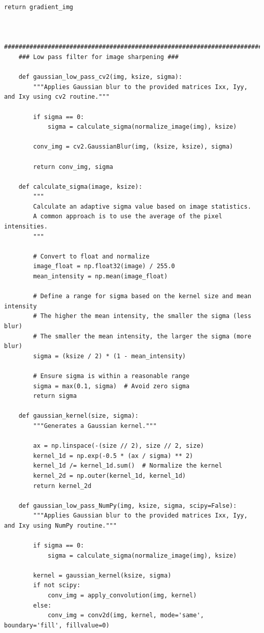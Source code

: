 \documentclass[11pt, conference, letterpaper]{IEEEtran}
\begin{document}
\begin{lstlisting}[style=python, caption={\texttt{image\_utils.py}}, label={lst:iutils}]
        return gradient_img
    
    
    ##########################################################################################
    ### Low pass filter for image sharpening ###
    
    def gaussian_low_pass_cv2(img, ksize, sigma):
        """Applies Gaussian blur to the provided matrices Ixx, Iyy, and Ixy using cv2 routine."""
        
        if sigma == 0:
            sigma = calculate_sigma(normalize_image(img), ksize)
        
        conv_img = cv2.GaussianBlur(img, (ksize, ksize), sigma)
    
        return conv_img, sigma
    
    def calculate_sigma(image, ksize):
        """
        Calculate an adaptive sigma value based on image statistics.
        A common approach is to use the average of the pixel intensities.
        """
        
        # Convert to float and normalize
        image_float = np.float32(image) / 255.0
        mean_intensity = np.mean(image_float)
    
        # Define a range for sigma based on the kernel size and mean intensity
        # The higher the mean intensity, the smaller the sigma (less blur)
        # The smaller the mean intensity, the larger the sigma (more blur)
        sigma = (ksize / 2) * (1 - mean_intensity)
    
        # Ensure sigma is within a reasonable range
        sigma = max(0.1, sigma)  # Avoid zero sigma
        return sigma
    
    def gaussian_kernel(size, sigma):
        """Generates a Gaussian kernel."""
                
        ax = np.linspace(-(size // 2), size // 2, size)
        kernel_1d = np.exp(-0.5 * (ax / sigma) ** 2)
        kernel_1d /= kernel_1d.sum()  # Normalize the kernel
        kernel_2d = np.outer(kernel_1d, kernel_1d)
        return kernel_2d
    
    def gaussian_low_pass_NumPy(img, ksize, sigma, scipy=False):
        """Applies Gaussian blur to the provided matrices Ixx, Iyy, and Ixy using NumPy routine."""
        
        if sigma == 0:
            sigma = calculate_sigma(normalize_image(img), ksize)
            
        kernel = gaussian_kernel(ksize, sigma)
        if not scipy:
            conv_img = apply_convolution(img, kernel)
        else:
            conv_img = conv2d(img, kernel, mode='same', boundary='fill', fillvalue=0)
        

\end{lstlisting}
\end{document}
